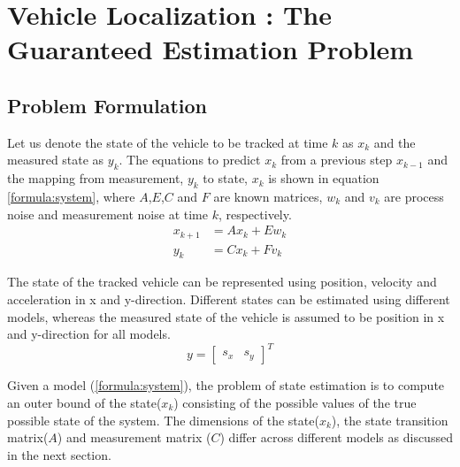 \chapter{Vehicle Localization : The Guaranteed Estimation Problem} \label{ch:problem}
\section{Problem Formulation}
Let us denote the state of the vehicle to be tracked at time $k$ as $x_k$ and the measured state as $y_k$. The equations to predict $x_k$ from a previous step $x_{k-1}$ and the mapping from measurement, $y_k$ to state, $x_k$ is shown in equation \eqref{formula:system}, where $A$,$E$,$C$ and $F$ are known matrices, $w_k$ and $v_k$ are process noise and measurement noise at time $k$, respectively. 
\begin{equation}
\label{formula:system}
\begin{split}
x_{k+1} &= Ax_k + Ew_k\\
y_k &= Cx_k + Fv_k
\end{split}
\end{equation}

The state of the tracked vehicle can be represented using position, velocity and acceleration in x and y-direction. Different states can be estimated using different models, whereas the measured state of the vehicle is assumed to be position in x and y-direction for all models.
\begin{equation*}
y =[ 
\begin{matrix}
s_x & s_y
\end{matrix}
]^T
\end{equation*}


Given a model (\eqref{formula:system}), the problem of state estimation is to compute an outer bound of the state($x_k$) consisting of the possible values of the true possible state of the system. The dimensions of the state($x_k$), the state transition matrix($A$) and measurement matrix ($C$) differ across different models as discussed in the next section.
